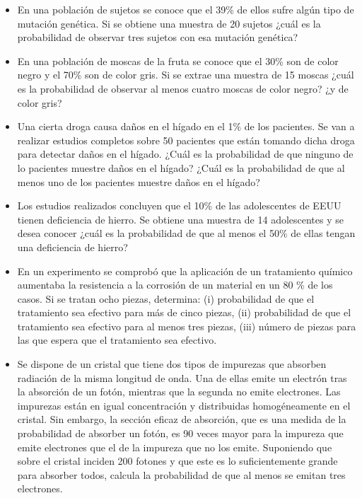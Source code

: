 \documentclass[
]{book}
\providecommand{\tightlist}{%
  \setlength{\itemsep}{0pt}\setlength{\parskip}{0pt}}
\begin{document}
\begin{itemize}
\tightlist
\item
  En una población de sujetos se conoce que el 39\% de ellos sufre algún tipo de mutación genética. Si se obtiene una muestra de 20 sujetos ¿cuál es la probabilidad de observar tres sujetos con esa mutación genética?
\item
  En una población de moscas de la fruta se conoce que el 30\% son de color negro y el 70\% son de color gris. Si se extrae una muestra de 15 moscas ¿cuál es la probabilidad de observar al menos cuatro moscas de color negro? ¿y de color gris?
\item
  Una cierta droga causa daños en el hígado en el 1\% de los pacientes. Se van a realizar estudios completos sobre 50 pacientes que están tomando dicha droga para detectar daños en el hígado. ¿Cuál es la probabilidad de que ninguno de lo pacientes muestre daños en el hígado? ¿Cuál es la probabilidad de que al menos uno de los pacientes muestre daños en el hígado?
\item
  Los estudios realizados concluyen que el 10\% de las adolescentes de EEUU tienen deficiencia de hierro. Se obtiene una muestra de 14 adolescentes y se desea conocer ¿cuál es la probabilidad de que al menos el 50\% de ellas tengan una deficiencia de hierro?
\item
  En un experimento se comprobó que la aplicación de un tratamiento químico aumentaba la resistencia a la corrosión de un material en un 80 \% de los casos. Si se tratan ocho piezas, determina: (i) probabilidad de que el tratamiento sea efectivo para más de cinco piezas, (ii) probabilidad de que el tratamiento sea efectivo para al menos tres piezas, (iii) número de piezas para las que espera que el tratamiento sea efectivo.
\item
  Se dispone de un cristal que tiene dos tipos de impurezas que absorben radiación de la misma longitud de onda. Una de ellas emite un electrón tras la absorción de un fotón, mientras que la segunda no emite electrones. Las impurezas están en igual concentración y distribuidas homogéneamente en el cristal. Sin embargo, la sección eficaz de absorción, que es una medida de la probabilidad de absorber un fotón, es 90 veces mayor para la impureza que emite electrones que el de la impureza que no los emite. Suponiendo que sobre el cristal inciden 200 fotones y que este es lo suficientemente grande para absorber todos, calcula la probabilidad de que al menos se emitan tres electrones.
\end{itemize}
\end{document}
